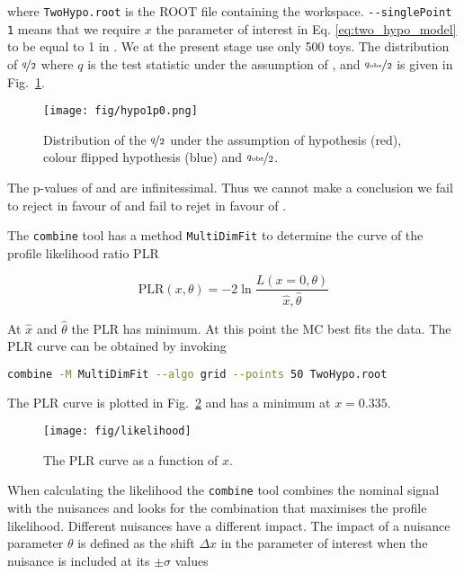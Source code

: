 \noindent where  \lstinline[language=sh]|TwoHypo.root| is the ROOT file containing the workspace. \lstinline[language=sh]|--singlePoint 1| means that we require $x$ \textendash the parameter of interest in Eq. \ref{eq:two_hypo_model} to be equal to 1 in \Halt. We at the present stage use only 500 toys. The distribution of $\nicefrac{q}{2}$ where $q$ is the test statistic under the assumption of \Hnull, \Halt and $\nicefrac{q_{\text{obs}}}{2}$ is given in Fig.~\ref{fig:hypo1p0}.

\begin{figure}
  \centering
  \texttt{[image: fig/hypo1p0.png]}
  \caption{Distribution of the $\nicefrac{q}{2}$ under the assumption of \ttbar hypothesis (red), colour flipped \ttbar hypothesis (blue) and $\nicefrac{q_{\text{obs}}}{2}$.}
  \label{fig:hypo1p0}
\end{figure}

The p-values of \Halt and \Hnull are infinitessimal. Thus we cannot make a conclusion \textendash we fail to reject \Hnull in favour of \Halt and fail to rejet \Halt in favour of \Hnull.

The \lstinline[language=sh]|combine| tool has a method \lstinline[language=sh]|MultiDimFit| to determine the curve of the profile likelihood ratio PLR

\begin{equation}
  \text{PLR}(x, \theta)=-2\ln\frac{L(x=0, \theta)}{\hat{x}, \hat{\theta}}
\end{equation}

At $\hat{x}$ and $\hat{\theta}$ the PLR has minimum. At this point the MC best fits the data. The PLR curve can be obtained by invoking

\begin{lstlisting}[language=sh, breaklines=true]
combine -M MultiDimFit --algo grid --points 50 TwoHypo.root
\end{lstlisting}

The PLR curve is plotted in Fig.~\ref{fig:likelihood} and has a minimum at $x=0.335$.

\begin{figure}
  \centering
  \texttt{[image: fig/likelihood]}
  \caption{The PLR curve as a function of $x$.}
  \label{fig:likelihood}
\end{figure}

When calculating the likelihood the \lstinline[language=sh]|combine| tool combines the nominal signal with the nuisances and looks for the combination that maximises the profile likelihood. Different nuisances have a different impact. The impact of a nuisance parameter $\theta$ is defined as the shift $\Delta x$ in the parameter of interest when the nuisance is included at its $\pm\sigma$ values

